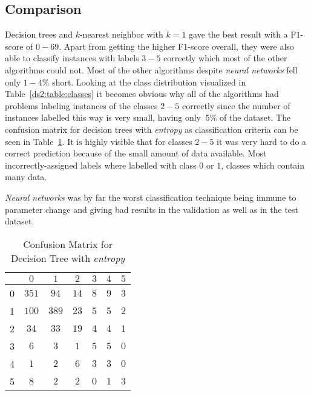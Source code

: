 \subsection{Comparison}
Decision trees and $k$-nearest neighbor with $k=1$ gave the best result with a F$1$-score of $0-69$. Apart from getting the higher F$1$-score overall, they were also able to classify instances with labels $3-5$ correctly which most of the other algorithms could not. Most of the other algorithms despite \textit{neural networks} fell only	$1-4\%$ short.
Looking at the class distribution visualized in Table~\ref{ds2:table:classes} it becomes obvious why all of the algorithms had problems labeling instances of the classes $2-5$ correctly since the number of instances labelled this way is very small, having only $~5\%$ of the dataset. The confusion matrix for decision trees with \textit{entropy} as classification criteria can be seen in Table~\ref{ds2:confmatrix}. It is highly visible that for classes $2-5$ it was very hard to do a correct prediction because of the small amount of data available. Most incorrectly-assigned labels where labelled with class $0$ or $1$, classes which contain many data.
\par \textit{Neural networks} was by far the worst classification technique being immune to parameter change and giving bad results in the validation as well as in the test dataset.

\begin{table}[p]
	\begin{center}
		\begin{tabular}{|c|c|c|c|c|c|c|}
		\hline	\backslashbox{Class}{Predicted} & $0$ & $1$ & $2$ & $3$ & $4$ & $5$ \\
		\hline  0 & $351$ & $94$ & $14$ & $8$ & $9$ & $3$ \\
		\hline  1 & $100$ & $389$ & $23$ & $5$ & $5$ & $2$ \\
		\hline  2 & $34$  & $33$ & $19$ & $4$ & $4$ & $1$ \\
		\hline  3 & $6$   & $3$ & $1$ & $5$ & $5$ & $0$ \\
		\hline  4 & $1$   & $2$ & $6$ & $3$ & $3$ & $0$ \\
		\hline  5 & $8$   & $2$ & $2$ & $0$ & $1$ & $3$ \\
		\end{tabular}
	\end{center}
		\caption{Confusion Matrix for Decision Tree with \textit{entropy}\label{ds2:confmatrix}}
\end{table}
\label{ds2:sec:comparison}
